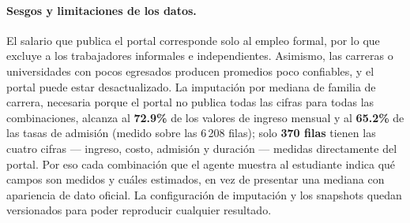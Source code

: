 \paragraph{Sesgos y limitaciones de los datos.} El salario que publica el
portal corresponde solo al empleo formal, por lo que excluye a los
trabajadores informales e independientes. Asimismo, las carreras o
universidades con pocos egresados producen promedios poco confiables, y el
portal puede estar desactualizado. La imputaci\'on por mediana de familia de
carrera, necesaria porque el portal no publica todas las cifras para todas las
combinaciones, alcanza al \textbf{72.9\%} de los valores de ingreso mensual y
al \textbf{65.2\%} de las tasas de admisi\'on (medido sobre las 6\,208 filas);
solo \textbf{370 filas} tienen las cuatro cifras --- ingreso, costo, admisi\'on
y duraci\'on --- medidas directamente del portal. Por eso cada combinaci\'on
que el agente muestra al estudiante indica qu\'e campos son medidos y
cu\'ales estimados, en vez de presentar una mediana con apariencia
de dato oficial. La configuraci\'on de imputaci\'on y los snapshots quedan
versionados para poder reproducir cualquier resultado.
